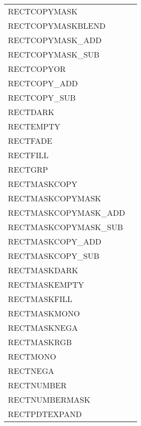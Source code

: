 {\begin{supertabular}{l@{\hs}l}
  RECTCOPYMASK              &           \\
  RECTCOPYMASKBLEND         &          \\
  RECTCOPYMASK\_ADD         &            \\
  RECTCOPYMASK\_SUB         &            \\
  RECTCOPYOR                &                 \\
  RECTCOPY\_ADD             &                \\
  RECTCOPY\_SUB             &                \\
  RECTDARK                  &              \\
  RECTEMPTY                 &            \\
  RECTFADE                  &               \\
  RECTFILL                  &               \\
  RECTGRP                   &\\
  RECTMASKCOPY              &       \\
  RECTMASKCOPYMASK          &   \\
  RECTMASKCOPYMASK\_ADD     &    \\
  RECTMASKCOPYMASK\_SUB     &    \\
  RECTMASKCOPY\_ADD         &        \\
  RECTMASKCOPY\_SUB         &        \\
  RECTMASKDARK              &\\
  RECTMASKEMPTY             &\\
  RECTMASKFILL              &\\
  RECTMASKMONO              &\\
  RECTMASKNEGA              &\\
  RECTMASKRGB               &\\
  RECTMONO                  &               \\
  RECTNEGA                  &             \\
  RECTNUMBER                &\\
  RECTNUMBERMASK            &\\
  RECTPDTEXPAND             &               \\

\end{supertabular}}
